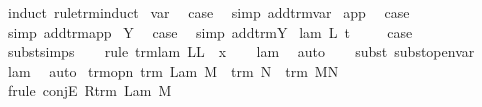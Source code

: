 \begin{isabellebody}
%
\isadelimproof
%
\endisadelimproof
%
\isatagproof
{}\isamarkupfalse%
\ {\isacharparenleft}induct\ rule{\isacharcolon}trm{\isachardot}induct{\isacharparenright}\isanewline
{}\isamarkupfalse%
\ var\ \isamarkupfalse%
\ {\isacharquery}case\ \isamarkupfalse%
\ {\isacharparenleft}simp\ add{\isacharcolon}trm{\isachardot}var{\isacharparenright}\isanewline
{}\isamarkupfalse%
\isanewline
{}\isamarkupfalse%
\ app\ \isamarkupfalse%
\ {\isacharquery}case\ \isamarkupfalse%
\ {\isacharparenleft}simp\ add{\isacharcolon}trm{\isachardot}app{\isacharparenright}\isanewline
{}\isamarkupfalse%
\isanewline
{}\isamarkupfalse%
\ Y\ \isamarkupfalse%
\ {\isacharquery}case\ \isamarkupfalse%
\ {\isacharparenleft}simp\ add{\isacharcolon}trm{\isachardot}Y{\isacharparenright}\isanewline
{}\isamarkupfalse%
\isanewline
{}\isamarkupfalse%
\ {\isacharparenleft}lam\ L\ t{\isacharparenright}\ \isanewline
\ \ \isamarkupfalse%
\ {\isacharquery}case\isanewline
\ \ \isamarkupfalse%
\ subst{\isachardot}simps\isanewline
\ \ \isamarkupfalse%
\ {\isacharparenleft}rule\ trm{\isachardot}lam{\isacharbrackleft}\ L{\isacharequal}{\isachardoublequoteopen}L\ {\isasymunion}\ {\isacharbraceleft}x{\isacharbraceright}{\isachardoublequoteclose}{\isacharbrackright}{\isacharparenright}\isanewline
\ \ \isamarkupfalse%
\ lam\ \isamarkupfalse%
\ auto{\isacharbrackleft}{}{\isacharbrackright}\isanewline
\ \ \isamarkupfalse%
\ {\isacharparenleft}subst\ subst{\isacharunderscore}open{\isacharunderscore}var{}{\isacharparenright}\isanewline
\ \ \isamarkupfalse%
\ lam\ \isamarkupfalse%
\ auto\isanewline
{}\isamarkupfalse%
%
\endisatagproof
{\isafoldproof}%
%
\isadelimproof
\isanewline
%
\endisadelimproof
\isanewline
{}\isamarkupfalse%
\ trm{\isacharunderscore}opn{\isacharcolon}\ {\isachardoublequoteopen}trm\ {\isacharparenleft}Lam\ M{\isacharparenright}\ {\isasymand}\ trm\ N\ {\isasymLongrightarrow}\ trm\ M{\isacharcircum}N{\isachardoublequoteclose}\isanewline
%
\isadelimproof
%
\endisadelimproof
%
\isatagproof
{}\isamarkupfalse%
\ {\isacharparenleft}frule\ conjE{\isacharbrackleft}\ R{\isacharequal}{\isachardoublequoteopen}trm\ {\isacharparenleft}Lam\ M{\isacharparenright}{\isachardoublequoteclose}{\isacharbrackright}{\isacharparenright}\isanewline

\end{isabellebody}
